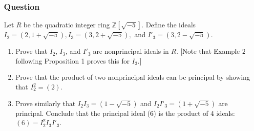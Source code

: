 \documentclass[12pt]{article}
\begin{document}
\subsubsection{Question}
Let $R$ be the quadratic integer ring $\mathbb{Z}[\sqrt{-5}]$. Define the ideals $I_2 = (2,1+\sqrt{-5}), I_3=(3,2+\sqrt{-5}),$ and $I'_3= (3,2-\sqrt{-5})$.
\begin{enumerate}
\item Prove that $I_2$, $I_3$, and $I'_3$ are nonprincipal ideals in $R$. [Note that Example 2 following Proposition 1 proves this for $I_3$.]
\item Prove that the product of two nonprincipal ideals can be principal by showing that $I_2^2=(2)$.
\item Prove similarly that $I_2 I_3 = (1-\sqrt{-5})$ and $I_2 I'_3= (1+\sqrt{-5})$ are principal. Conclude that the principal ideal (6) is the product of 4 ideals: $(6) =I_2^2 I_3 I'_3$.
\end{enumerate}
\end{document}
